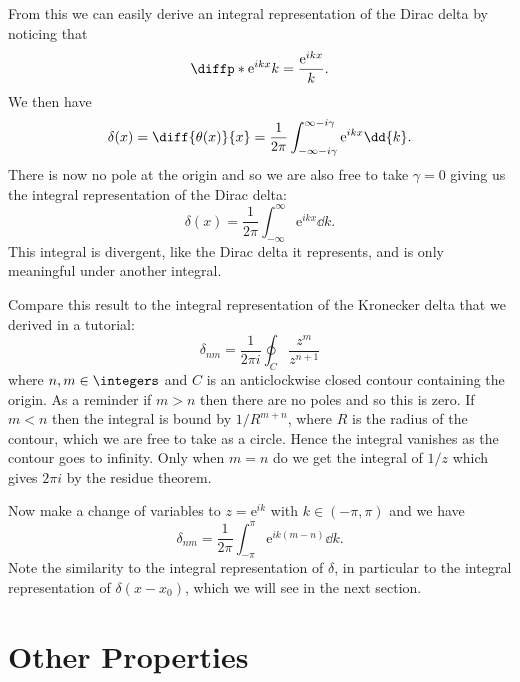 \documentclass[fleqn]{NotesClass}
\newcommand*{\e}{\mathrm{e}}
\begin{document}
    From this we can easily derive an integral representation of the Dirac delta by noticing that
    \begin{equation}
        \diffp*{\e^{ikx}}{k} = \frac{\e^{ikx}}{k}.
    \end{equation}
    We then have
    \begin{equation}
        \delta(x) = \diff{\theta(x)}{x} = \frac{1}{2\pi} \int_{-\infty-i\gamma}^{\infty-i\gamma} \e^{ikx} \dd{k}.
    \end{equation}
    There is now no pole at the origin and so we are also free to take \(\gamma = 0\) giving us the integral representation of the Dirac delta:
    \begin{equation}
        \delta(x) = \frac{1}{2\pi}\int_{-\infty}^{\infty} \e^{ikx} \dd{k}.
    \end{equation}
    This integral is divergent, like the Dirac delta it represents, and is only meaningful under another integral.
    
    Compare this result to the integral representation of the Kronecker delta that we derived in a tutorial:
    \begin{equation}
        \delta_{nm} = \frac{1}{2\pi i} \oint_{C} \frac{z^m}{z^{n+1}}
    \end{equation}
    where \(n, m \in \integers\) and \(C\) is an anticlockwise closed contour containing the origin.
    As a reminder if \(m > n\) then there are no poles and so this is zero.
    If \(m < n\) then the integral is bound by \(1/R^{m+n}\), where \(R\) is the radius of the contour, which we are free to take as a circle.
    Hence the integral vanishes as the contour goes to infinity.
    Only when \(m = n\) do we get the integral of \(1/z\) which gives \(2\pi i\) by the residue theorem.
    
    Now make a change of variables to \(z = \e^{ik}\) with \(k \in (-\pi, \pi)\) and we have
    \begin{equation}\label{eqn:integral representation kronecker delta}
        \delta_{nm} = \frac{1}{2\pi} \int_{-\pi}^{\pi} \e^{ik(m - n)} \dd{k}.
    \end{equation}
    Note the similarity to the integral representation of \(\delta\), in particular to the integral representation of \(\delta(x - x_0)\), which we will see in the next section.
    
    \section{Other Properties}
\end{document}
